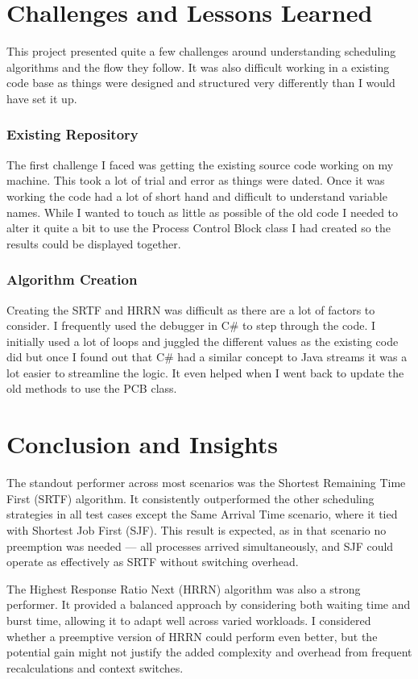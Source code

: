 \documentclass[conference]{report}
\begin{document}
\chapter{Challenges and Lessons Learned}
This project presented quite a few challenges around understanding scheduling algorithms and the flow they follow. It was also difficult working in a existing code base as things were designed and structured very differently than I would have set it up.

\subsection*{Existing Repository}
The first challenge I faced was getting the existing source code working on my machine. This took a lot of trial and error as things were dated. Once it was working the code had a lot of short hand and difficult to understand variable names. While I wanted to touch as little as possible of the old code I needed to alter it quite a bit to use the Process Control Block class I had created so the results could be displayed together.

\subsection*{Algorithm Creation}
Creating the SRTF and HRRN was difficult as there are a lot of factors to consider. I frequently used the debugger in C\# to step through the code. I initially used a lot of loops and juggled the different values as the existing code did but once I found out that C\# had a similar concept to Java streams it was a lot easier to streamline the logic. It even helped when I went back to update the old methods to use the PCB class. 

\chapter{Conclusion and Insights}
The standout performer across most scenarios was the Shortest Remaining Time First (SRTF) algorithm. It consistently outperformed the other scheduling strategies in all test cases except the Same Arrival Time scenario, where it tied with Shortest Job First (SJF). This result is expected, as in that scenario no preemption was needed — all processes arrived simultaneously, and SJF could operate as effectively as SRTF without switching overhead.

The Highest Response Ratio Next (HRRN) algorithm was also a strong performer. It provided a balanced approach by considering both waiting time and burst time, allowing it to adapt well across varied workloads. I considered whether a preemptive version of HRRN could perform even better, but the potential gain might not justify the added complexity and overhead from frequent recalculations and context switches.
\end{document}
